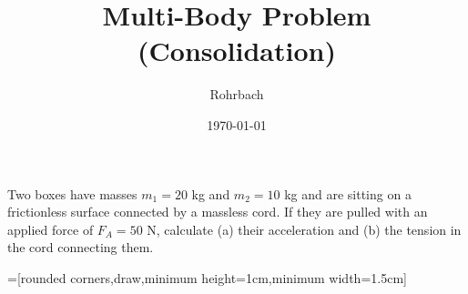 \documentclass[10pt]{exam}
\title{Multi-Body Problem (Consolidation)}
\author{Rohrbach}
\date{\today}
\begin{document}
\maketitle

\noindent
Two boxes have masses $m_1=20$ kg and $m_2=10$ kg and are sitting on a frictionless surface connected by a massless cord. If they are pulled with an applied force of $F_A=50$ N, calculate (a) their acceleration and (b) the tension in the cord connecting them.


=[rounded corners,draw,minimum height=1cm,minimum width=1.5cm]

\end{document}
